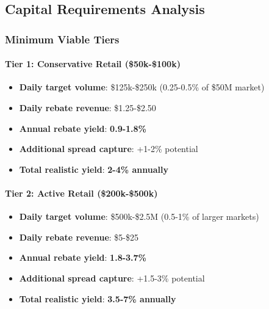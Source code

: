 \hypertarget{capital-requirements-analysis}{%
\subsection{Capital Requirements
Analysis}\label{capital-requirements-analysis}}

\hypertarget{minimum-viable-tiers}{%
\subsubsection{Minimum Viable Tiers}\label{minimum-viable-tiers}}

\hypertarget{tier-1-conservative-retail-50k-100k}{%
\paragraph{Tier 1: Conservative Retail
(\$50k-\$100k)}\label{tier-1-conservative-retail-50k-100k}}

\begin{itemize}
\tightlist
\item
  \textbf{Daily target volume}: \$125k-\$250k (0.25-0.5\% of \$50M
  market)
\item
  \textbf{Daily rebate revenue}: \$1.25-\$2.50
\item
  \textbf{Annual rebate yield}: \textbf{0.9-1.8\%}
\item
  \textbf{Additional spread capture}: +1-2\% potential
\item
  \textbf{Total realistic yield}: \textbf{2-4\% annually}
\end{itemize}

\hypertarget{tier-2-active-retail-200k-500k}{%
\paragraph{Tier 2: Active Retail
(\$200k-\$500k)}\label{tier-2-active-retail-200k-500k}}

\begin{itemize}
\tightlist
\item
  \textbf{Daily target volume}: \$500k-\$2.5M (0.5-1\% of larger
  markets)
\item
  \textbf{Daily rebate revenue}: \$5-\$25
\item
  \textbf{Annual rebate yield}: \textbf{1.8-3.7\%}
\item
  \textbf{Additional spread capture}: +1.5-3\% potential
\item
  \textbf{Total realistic yield}: \textbf{3.5-7\% annually}
\end{itemize}

